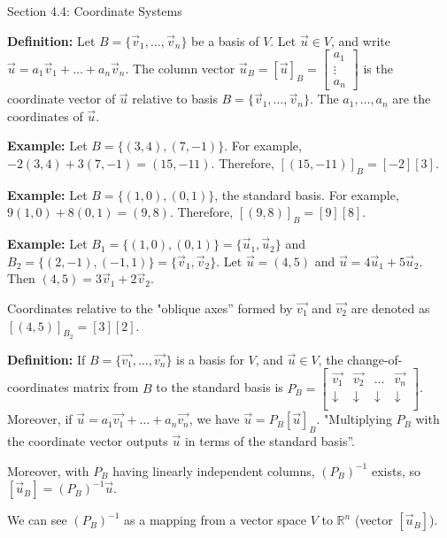 \documentclass{article}
\begin{document}
Section 4.4: Coordinate Systems

\textbf{Definition:} Let \( B = \{ \vec{v}_1, \ldots, \vec{v}_n \} \) be a basis of \( V \). Let \( \vec{u} \in V \), and write \( \vec{u} = a_1 \vec{v}_1 + \ldots + a_n \vec{v}_n \). The column vector \( \vec{u}_B = [\vec{u}]_B = \begin{bmatrix} a_1 \\ \vdots \\ a_n \end{bmatrix} \) is the coordinate vector of \( \vec{u} \) relative to basis \( B = \{ \vec{v}_1, \ldots, \vec{v}_n \} \). The \( a_1, \ldots, a_n \) are the coordinates of \( \vec{u} \).


\textbf{Example:} Let \( B = \{(3,4), (7,-1)\} \). For example, \( -2(3,4)+3(7,-1) = (15,-11) \). Therefore, \( [(15,-11)]_B = [-2][3] \).

\textbf{Example:} Let \( B = \{(1,0), (0,1)\} \), the standard basis. For example, \( 9(1,0)+8(0,1) = (9,8) \). Therefore, \( [(9,8)]_B = [9][8] \). 

\textbf{Example:} Let \( B_1 = \{(1,0),(0,1)\} = \{\vec{u}_1,\vec{u}_2\} \) and \( B_2 = \{(2,-1),(-1,1)\} = \{\vec{v}_1,\vec{v}_2\} \). Let \( \vec{u} = (4,5) \) and \( \vec{u} = 4\vec{u}_1+5\vec{u}_2 \). Then \( (4,5) = 3\vec{v}_1+2\vec{v}_2 \).

Coordinates relative to the "oblique axes'' formed by \(\vec{v_1}\) and \(\vec{v_2}\) are denoted as \( [(4,5)]_{B_2} = [3][2] \).

\textbf{Definition:} If \(B = \{\vec{v_1}, \ldots, \vec{v_n}\}\) is a basis for \(V\), and \(\vec{u} \in V\), the change-of-coordinates matrix from \(B\) to the standard basis is \(P_B = \begin{bmatrix}    \vec{v_1} & \vec{v_2} & \ldots & \vec{v_n} \\    \downarrow & \downarrow & \downarrow & \downarrow \\\end{bmatrix}\). Moreover, if \(\vec{u} = a_1\vec{v_1} + \ldots + a_n\vec{v_n}\), we have \(\vec{u} = P_B [\vec{u}]_B\). "Multiplying \(P_B\) with the coordinate vector outputs \(\vec{u}\) in terms of the standard basis''.

Moreover, with \(P_B\) having linearly independent columns, \((P_B)^{-1}\) exists, so \([\vec{u}_B] = (P_B)^{-1} \vec{u}\).

We can see \((P_B)^{-1}\) as a mapping from a vector space \(V\) to \(\mathbb{R}^n\) (vector \([\vec{u}_B]\)).
\end{document}
